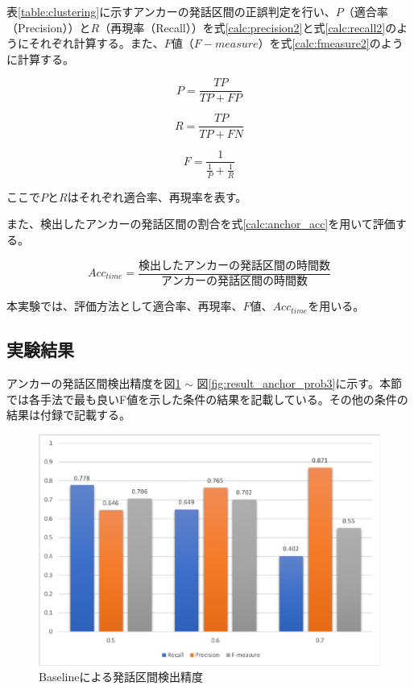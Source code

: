 表\ref{table:clustering}に示すアンカーの発話区間の正誤判定を行い、$P$（適合率（Precision））と$R$（再現率（Recall））を式\ref{calc:precision2}と式\ref{calc:recall2}のようにそれぞれ計算する。また、$F$値（$F-measure$）を式\ref{calc:fmeasure2}のように計算する。

\begin{equation}
\label{calc:precision2}
P = \frac{TP}{TP + FP}
\end{equation}

\begin{equation}
\label{calc:recall2}
R = \frac{TP}{TP + FN}
\end{equation}

\begin{equation}
\label{calc:fmeasure2}
F = \frac{1}{\frac{1}{P} + \frac{1}{R}}
\end{equation}

ここで$P$と$R$はそれぞれ適合率、再現率を表す。

また、検出したアンカーの発話区間の割合を式\ref{calc:anchor_acc}を用いて評価する。

\begin{equation}
\label{calc:anchor_acc}
Acc_{time} = \frac{検出したアンカーの発話区間の時間数}{アンカーの発話区間の時間数}
\end{equation}

本実験では、評価方法として適合率、再現率、$F$値、$Acc_{time}$を用いる。

\subsection{実験結果}
アンカーの発話区間検出精度を図\ref{fig:result_anchor_baseline} $\sim$ 図\ref{fig:result_anchor_prob3}に示す。本節では各手法で最も良いF値を示した条件の結果を記載している。その他の条件の結果は付録で記載する。

\begin{figure}[H]
  \begin{center}
    \includegraphics[scale=0.8]{./figure/get_anchor_baseline.eps}
  \end{center}
  \caption{Baselineによる発話区間検出精度 \label{fig:result_anchor_baseline}}
\end{figure}


